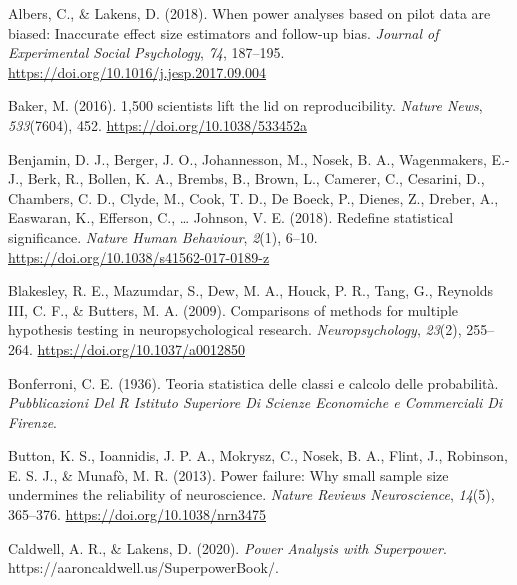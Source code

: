 \documentclass[
]{article}
\newlength{\cslhangindent}
\newlength{\cslentryspacingunit} %
\newenvironment{CSLReferences}[2] %
 {%
  \setlength{\parindent}{0pt}
  \ifodd #1
  \let\oldpar\par
  \def\par{\hangindent=\cslhangindent\oldpar}
  \fi
  \setlength{\parskip}{#2\cslentryspacingunit}
 }%
 {}
\begin{document}
\hypertarget{refs}{}
\begin{CSLReferences}{1}{0}
\leavevmode{}%
Albers, C., \& Lakens, D. (2018). When power analyses based on pilot
data are biased: {Inaccurate} effect size estimators and follow-up bias.
\emph{Journal of Experimental Social Psychology}, \emph{74}, 187--195.
\url{https://doi.org/10.1016/j.jesp.2017.09.004}

\leavevmode{}%
Baker, M. (2016). 1,500 scientists lift the lid on reproducibility.
\emph{Nature News}, \emph{533}(7604), 452.
\url{https://doi.org/10.1038/533452a}

\leavevmode{}%
Benjamin, D. J., Berger, J. O., Johannesson, M., Nosek, B. A.,
Wagenmakers, E.-J., Berk, R., Bollen, K. A., Brembs, B., Brown, L.,
Camerer, C., Cesarini, D., Chambers, C. D., Clyde, M., Cook, T. D., De
Boeck, P., Dienes, Z., Dreber, A., Easwaran, K., Efferson, C., \ldots{}
Johnson, V. E. (2018). Redefine statistical significance. \emph{Nature
Human Behaviour}, \emph{2}(1), 6--10.
\url{https://doi.org/10.1038/s41562-017-0189-z}

\leavevmode{}%
Blakesley, R. E., Mazumdar, S., Dew, M. A., Houck, P. R., Tang, G.,
Reynolds III, C. F., \& Butters, M. A. (2009). Comparisons of methods
for multiple hypothesis testing in neuropsychological research.
\emph{Neuropsychology}, \emph{23}(2), 255--264.
\url{https://doi.org/10.1037/a0012850}

\leavevmode{}%
Bonferroni, C. E. (1936). Teoria statistica delle classi e calcolo delle
probabilit{à}. \emph{Pubblicazioni Del R Istituto Superiore Di Scienze
Economiche e Commerciali Di Firenze}.

\leavevmode{}%
Button, K. S., Ioannidis, J. P. A., Mokrysz, C., Nosek, B. A., Flint,
J., Robinson, E. S. J., \& Munafò, M. R. (2013). Power failure: Why
small sample size undermines the reliability of neuroscience.
\emph{Nature Reviews Neuroscience}, \emph{14}(5), 365--376.
\url{https://doi.org/10.1038/nrn3475}

\leavevmode{}%
Caldwell, A. R., \& Lakens, D. (2020). \emph{Power {Analysis} with
{Superpower}}. https://aaroncaldwell.us/SuperpowerBook/.


\end{CSLReferences}
\end{document}
